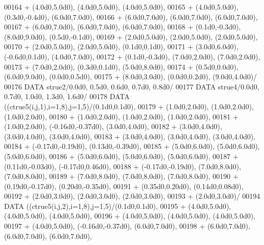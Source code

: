 \begin{DoxyCode}
00164      +                  (4.0d0,5.0d0), (4.0d0,5.0d0), (4.0d0,5.0d0),
00165      +                  (4.0d0,5.0d0), (0.3d0,-0.4d0), (6.0d0,7.0d0),
00166      +                  (6.0d0,7.0d0), (6.0d0,7.0d0), (6.0d0,7.0d0),
00167      +                  (6.0d0,7.0d0), (6.0d0,7.0d0), (6.0d0,7.0d0),
00168      +                  (0.1d0,-0.3d0), (8.0d0,9.0d0), (0.5d0,-0.1d0),
00169      +                  (2.0d0,5.0d0), (2.0d0,5.0d0), (2.0d0,5.0d0),
00170      +                  (2.0d0,5.0d0), (2.0d0,5.0d0), (0.1d0,0.1d0),
00171      +                  (3.0d0,6.0d0), (-0.6d0,0.1d0), (4.0d0,7.0d0),
00172      +                  (0.1d0,-0.3d0), (7.0d0,2.0d0), (7.0d0,2.0d0),
00173      +                  (7.0d0,2.0d0), (0.3d0,0.1d0), (5.0d0,8.0d0),
00174      +                  (0.5d0,0.0d0), (6.0d0,9.0d0), (0.0d0,0.5d0),
00175      +                  (8.0d0,3.0d0), (0.0d0,0.2d0), (9.0d0,4.0d0)/
00176       \textcolor{keyword}{DATA}              strue2/0.0d0, 0.5d0, 0.6d0, 0.7d0, 0.8d0/
00177       \textcolor{keyword}{DATA}              strue4/0.0d0, 0.7d0, 1.0d0, 1.3d0, 1.6d0/
00178       \textcolor{keyword}{DATA}              ((ctrue5(i,j,1),i=1,8),j=1,5)/(0.1d0,0.1d0),
00179      +                  (1.0d0,2.0d0), (1.0d0,2.0d0), (1.0d0,2.0d0),
00180      +                  (1.0d0,2.0d0), (1.0d0,2.0d0), (1.0d0,2.0d0),
00181      +                  (1.0d0,2.0d0), (-0.16d0,-0.37d0), (3.0d0,4.0d0),
00182      +                  (3.0d0,4.0d0), (3.0d0,4.0d0), (3.0d0,4.0d0),
00183      +                  (3.0d0,4.0d0), (3.0d0,4.0d0), (3.0d0,4.0d0),
00184      +                  (-0.17d0,-0.19d0), (0.13d0,-0.39d0),
00185      +                  (5.0d0,6.0d0), (5.0d0,6.0d0), (5.0d0,6.0d0),
00186      +                  (5.0d0,6.0d0), (5.0d0,6.0d0), (5.0d0,6.0d0),
00187      +                  (0.11d0,-0.03d0), (-0.17d0,0.46d0),
00188      +                  (-0.17d0,-0.19d0), (7.0d0,8.0d0), (7.0d0,8.0d0),
00189      +                  (7.0d0,8.0d0), (7.0d0,8.0d0), (7.0d0,8.0d0),
00190      +                  (0.19d0,-0.17d0), (0.20d0,-0.35d0),
00191      +                  (0.35d0,0.20d0), (0.14d0,0.08d0),
00192      +                  (2.0d0,3.0d0), (2.0d0,3.0d0), (2.0d0,3.0d0),
00193      +                  (2.0d0,3.0d0)/
00194       \textcolor{keyword}{DATA}              ((ctrue5(i,j,2),i=1,8),j=1,5)/(0.1d0,0.1d0),
00195      +                  (4.0d0,5.0d0), (4.0d0,5.0d0), (4.0d0,5.0d0),
00196      +                  (4.0d0,5.0d0), (4.0d0,5.0d0), (4.0d0,5.0d0),
00197      +                  (4.0d0,5.0d0), (-0.16d0,-0.37d0), (6.0d0,7.0d0),
00198      +                  (6.0d0,7.0d0), (6.0d0,7.0d0), (6.0d0,7.0d0),

\end{DoxyCode}
